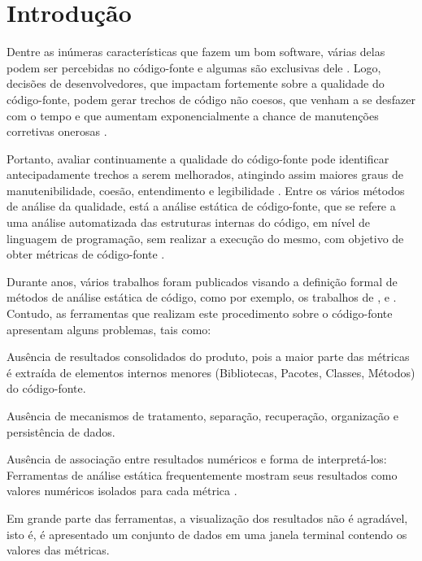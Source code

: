 \chapter{Introdução}


Dentre as inúmeras características que fazem um bom software, várias delas podem ser percebidas no código-fonte e algumas são exclusivas dele \cite{Meirelles2013}. Logo, decisões de desenvolvedores, que impactam fortemente sobre a qualidade do código-fonte, podem gerar trechos de código não coesos, que venham a se desfazer com o tempo e que aumentam exponencialmente a chance de manutenções corretivas onerosas \cite{Meirelles2013} \cite{beck2007implementation} \cite{beck1999}.



Portanto, avaliar continuamente a qualidade do código-fonte pode identificar antecipadamente trechos a serem melhorados, atingindo assim maiores graus de manutenibilidade, coesão, entendimento e legibilidade \cite{fowler1999refactoring}. Entre os vários métodos de análise da qualidade, está a análise estática de código-fonte, que se refere a uma análise automatizada das estruturas internas do código, em nível de linguagem de programação, sem realizar a execução do mesmo, com objetivo de obter métricas de código-fonte \cite{Terra2008} 
\cite{Emanuelsson2008} \cite{Wichmann95}  \cite{Nielson:1999} 
\cite{Sommerville10}. 

Durante anos, vários trabalhos foram publicados visando a definição formal de métodos de análise estática de código, como por exemplo, os trabalhos de , 
 e .
Contudo, as ferramentas que realizam este procedimento sobre o código-fonte 
apresentam alguns problemas, tais como:


\begin{problems}
    \item Ausência de resultados consolidados do produto, pois a maior 
	parte das métricas é extraída de elementos internos menores (Bibliotecas, 
	Pacotes, Classes, Métodos) do código-fonte.
    
	\item Ausência de mecanismos de tratamento, separação, recuperação, 
	organização e persistência de dados. 
	
	\item Ausência de associação entre resultados numéricos e forma de 
	interpretá-los: Ferramentas de análise estática frequentemente mostram 
	seus resultados como valores numéricos isolados para cada métrica 
	\cite{Meirelles2013}. 
	
	\item Em grande parte das ferramentas, a visualização dos resultados não é 
	agradável, isto é, é apresentado um conjunto de dados em uma janela 
	terminal contendo os valores das métricas.
	
    \end{problems}
	
